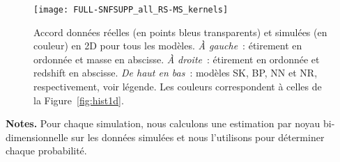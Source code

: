 \documentclass[../main/main.tex]{subfiles}
\begin{document}
\begin{figure}[p]
    \vspace*{-2.2cm}
    \centerfloat
    \texttt{[image: FULL-SNFSUPP\_all\_RS-MS\_kernels]}
    \caption[Accord entre les données réelles et simulées en 2 dimensions pour
    tous les modèles]{Accord données réelles (en points bleus transparents) et
        simulées (en couleur) en 2D pour tous les modèles. \textit{À gauche}~:
        étirement en ordonnée et masse en abscisse. \textit{À droite}~:
        étirement en ordonnée et redshift en abscisse. \textit{De haut en bas}~:
    modèles SK, BP, NN et NR, respectivement, voir légende. Les couleurs
correspondent à celles de la Figure~\ref{fig:hist1d}.}
    \label{fig:2dhex}
\end{figure}

\begin{table}[ht]
    \centering
     \caption[Comparaison de la capacité de chaque simulation à représenter
        les données en deux dimensions]{Comparaison de la capacité de chaque
            simulation à représenter les données d'étirement et de masse d'une
        part, et d'étirement et de redshift d'autre part.}
    \label{tab:chi2comp}
    \begin{threeparttable}
    \begin{tablenotes}[flushleft]
        \item \small \textbf{\hspace{-3,2pt}Notes.} Pour chaque simulation, nous
            calculons une estimation par noyau bi-dimensionnelle sur les données
            simulées et nous l'utilisons pour déterminer chaque probabilité.
    \end{tablenotes}
    \end{threeparttable}
\end{table}
\end{document}
